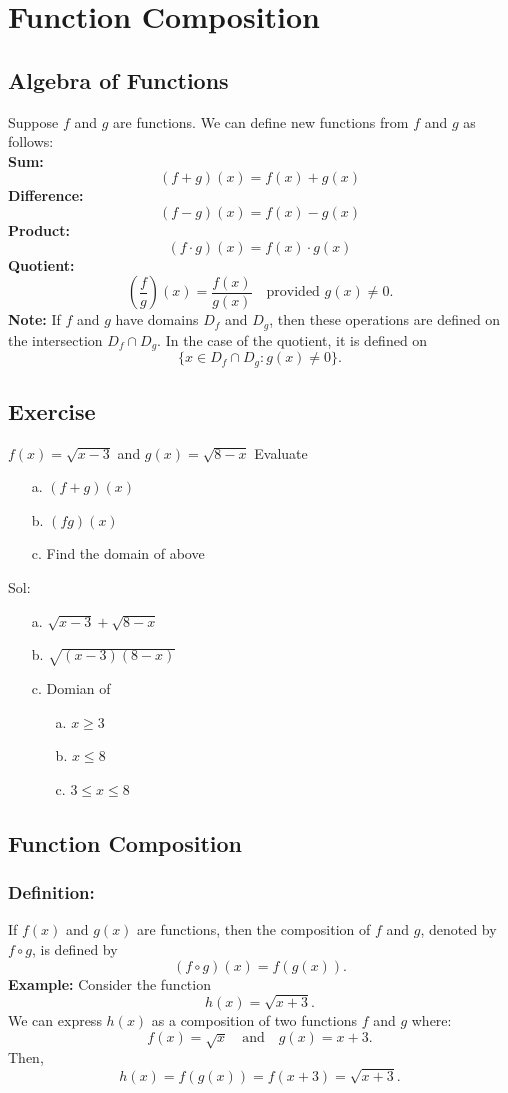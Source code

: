 \section{Function Composition}
\subsection{Algebra of Functions}
Suppose \(f\) and \(g\) are functions. We can define new functions from \(f\) and \(g\) as follows: \\
\textbf{Sum:}
\[ (f+g)(x) = f(x) + g(x) \]
\textbf{Difference:}
\[ (f-g)(x) = f(x) - g(x) \]
\textbf{Product:}
\[ (f\cdot g)(x) = f(x) \cdot g(x) \]
\textbf{Quotient:}
\[ \left(\frac{f}{g}\right)(x) = \frac{f(x)}{g(x)} \quad \text{provided } g(x) \neq 0. \]
\textbf{Note:} If \(f\) and \(g\) have domains \(D_f\) and \(D_g\), then these operations are defined on the intersection \(D_f \cap D_g\). In the case of the quotient, it is defined on
\[ \{x \in D_f \cap D_g : g(x) \neq 0\}. \]

\subsection{Exercise}
\( f(x)  = \sqrt{x-3}\) and \(g(x) = \sqrt{8 - x } \)
Evaluate
\begin{enumerate}
  \item[a.] \((f+g)(x)\)
  \item[b.]  \((fg)(x)\)
  \item[c.] Find the domain of above
\end{enumerate}
Sol:
\begin{enumerate}
  \item[a.] \(\sqrt{x-3} + \sqrt{8-x} \)
  \item[b.] \(\sqrt{(x-3)(8-x)} \)
  \item[c.]  Domian of \begin{enumerate}
    \item[a.] \(x\geq 3 \)
    \item[b.] \(x \leq 8 \)
    \item[c.] \( 3 \leq x \leq 8 \)
  \end{enumerate}
\end{enumerate}

\subsection{Function Composition}
\subsubsection{Definition:}
If \( f(x) \) and \( g(x) \) are functions, then the composition of \( f \) and \( g \), denoted by \( f \circ g \), is defined by
\[ (f \circ g)(x) = f(g(x)). \]
\textbf{Example:}
Consider the function
\[ h(x) = \sqrt{x+3}. \]
We can express \( h(x) \) as a composition of two functions \( f \) and \( g \) where:
\[ f(x) = \sqrt{x} \quad \text{and} \quad g(x) = x+3. \]
Then,
\[ h(x) = f(g(x)) = f(x+3) = \sqrt{x+3}. \]

